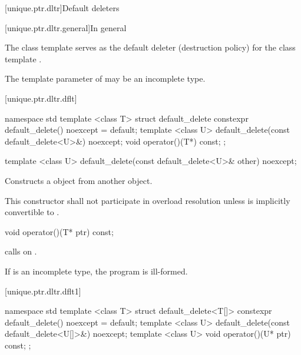 [unique.ptr.dltr]{Default deleters}

[unique.ptr.dltr.general]{In general}

\pnum
The class template  serves as the default deleter (destruction policy)
for the class template .

\pnum
The template parameter  of  may be
an incomplete type.

[unique.ptr.dltr.dflt]{}

\begin{codeblock}
namespace std {
  template <class T> struct default_delete {
    constexpr default_delete() noexcept = default;
    template <class U> default_delete(const default_delete<U>&) noexcept;
    void operator()(T*) const;
  };
}
\end{codeblock}

\begin{itemdecl}
template <class U> default_delete(const default_delete<U>& other) noexcept;
\end{itemdecl}

\begin{itemdescr}
\pnum
\effects Constructs a  object
from another  object.

\pnum
\remarks This constructor shall not participate in overload resolution unless
 is implicitly convertible to .
\end{itemdescr}

\begin{itemdecl}
void operator()(T* ptr) const;
\end{itemdecl}

\begin{itemdescr}
\pnum
\effects calls  on .

\pnum
\notes If  is an incomplete type, the program is ill-formed.
\end{itemdescr}

[unique.ptr.dltr.dflt1]{}

\begin{codeblock}
namespace std {
  template <class T> struct default_delete<T[]> {
    constexpr default_delete() noexcept = default;
    template <class U> default_delete(const default_delete<U[]>&) noexcept;
    template <class U> void operator()(U* ptr) const;
  };
}
\end{codeblock}

